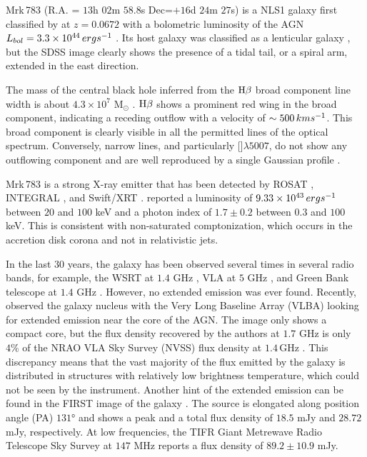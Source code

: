 \documentclass[../main.tex]{subfiles}
\begin{document}
Mrk\,783 (R.A. = $13$h $02$m $58.8$s Dec=$+16$d $24$m $27$s) is a NLS1 galaxy first classified by \citet{Osterbrock85} at $z = 0.0672$ \citep{Hewitt91} with a bolometric luminosity of the AGN $L_{bol} = 3.3\times10^{44}\,erg s^{-1}$ \citep{Berton15a}.
Its host galaxy was classified as a lenticular galaxy \citep{Petrosian07}, but the SDSS image clearly shows the presence of a tidal tail, or a spiral arm, extended in the east direction.

The mass of the central black hole inferred from the $\rm H\beta$ broad component line width is about $4.3\times10^7$ M$_{\odot}$ \citep{Berton15a}.
$\rm H\beta$ shows a prominent red wing in the broad component, indicating a receding outflow with a velocity of $\sim500\,km s^{-1}$. 
This broad component is clearly visible in all the permitted lines of the optical spectrum. 
Conversely, narrow lines, and particularly []$\lambda5007$, do not show any outflowing component and are well reproduced by a single Gaussian profile \citep{Berton16b}.
 
Mrk\,783 is a strong X-ray emitter that has been detected by ROSAT \citep{Schwope00}, INTEGRAL \citep{Krivonos07}, and Swift/XRT \citep{Panessa11}.  
\citet{Panessa11} reported a luminosity of $9.33\times10^{43}\,erg s^{-1}$ between $20$ and $100$ keV and a photon index of $1.7\pm0.2$ between $0.3$ and $100$ keV.
This is consistent with non-saturated comptonization, which occurs in the accretion disk corona and not in relativistic jets.

In the last 30 years, the galaxy has been observed several times in several radio bands, for example, the WSRT at $1.4$ GHz \citep{Meurs81}, VLA at $5$ GHz \citep{Ulvestad84,Ulvestad95}, and Green Bank telescope at $1.4$ GHz \citep{Bicay95}.
However, no extended emission was ever found.
Recently, \citet{Doi13} observed the galaxy nucleus with the Very Long Baseline Array (VLBA) looking for extended emission near the core of the AGN.
The image only shows a compact core, but the flux density recovered by the authors at $1.7$ GHz is only $4\%$ of the NRAO VLA Sky Survey (NVSS) flux density at $1.4\,$GHz \citep[$S_{\nu}=33.2\,$mJy;][]{Condon98}.
This discrepancy means that the vast majority of the flux emitted by the galaxy is distributed in structures with relatively low brightness temperature, which could not be seen by the instrument.
Another hint of the extended emission can be found in the FIRST image of the galaxy \citep{Becker95}.
The source is elongated along position angle (PA) $\ang{131}$ and shows a peak and a total flux density of $18.5$ mJy and $28.72$ mJy, respectively.
At low frequencies, the TIFR Giant Metrewave Radio Telescope Sky Survey \citep[TGSS;][]{Intema17} at $147$ MHz reports a flux density of $89.2\pm10.9$ mJy.
\end{document}
